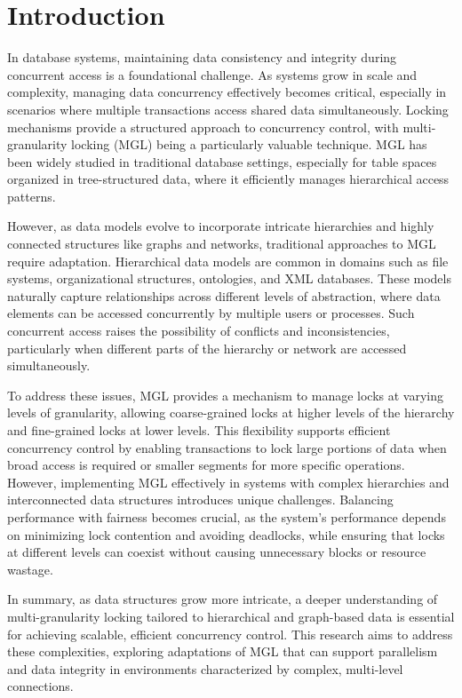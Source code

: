 %


\chapter{Introduction}
\adjustmtc


In database systems, maintaining data consistency and integrity during concurrent access is a foundational challenge. As systems grow in scale and complexity, managing data concurrency effectively becomes critical, especially in scenarios where multiple transactions access shared data simultaneously. Locking mechanisms provide a structured approach to concurrency control, with multi-granularity locking (MGL) being a particularly valuable technique. MGL has been widely studied in traditional database settings, especially for table spaces organized in tree-structured data, where it efficiently manages hierarchical access patterns.

However, as data models evolve to incorporate intricate hierarchies and highly connected structures like graphs and networks, traditional approaches to MGL require adaptation. Hierarchical data models are common in domains such as file systems, organizational structures, ontologies, and XML databases. These models naturally capture relationships across different levels of abstraction, where data elements can be accessed concurrently by multiple users or processes. Such concurrent access raises the possibility of conflicts and inconsistencies, particularly when different parts of the hierarchy or network are accessed simultaneously.

To address these issues, MGL provides a mechanism to manage locks at varying levels of granularity, allowing coarse-grained locks at higher levels of the hierarchy and fine-grained locks at lower levels. This flexibility supports efficient concurrency control by enabling transactions to lock large portions of data when broad access is required or smaller segments for more specific operations. However, implementing MGL effectively in systems with complex hierarchies and interconnected data structures introduces unique challenges. Balancing performance with fairness becomes crucial, as the system’s performance depends on minimizing lock contention and avoiding deadlocks, while ensuring that locks at different levels can coexist without causing unnecessary blocks or resource wastage.

In summary, as data structures grow more intricate, a deeper understanding of multi-granularity locking tailored to hierarchical and graph-based data is essential for achieving scalable, efficient concurrency control. This research aims to address these complexities, exploring adaptations of MGL that can support parallelism and data integrity in environments characterized by complex, multi-level connections.


